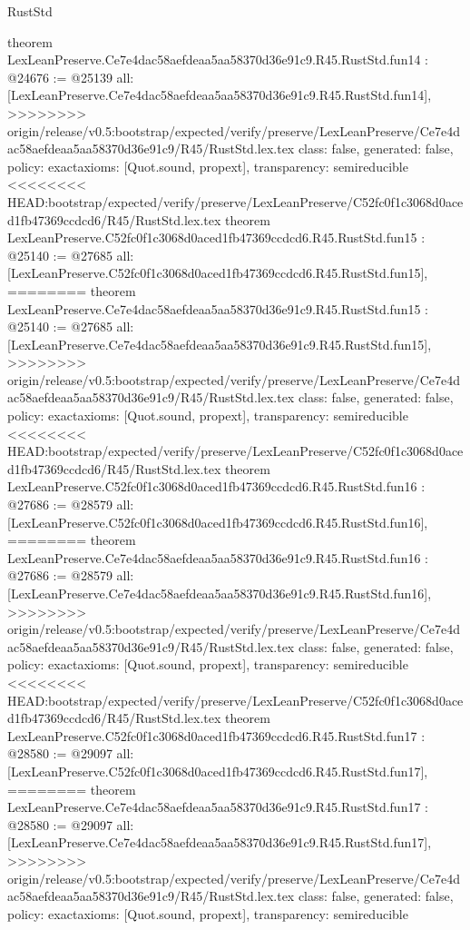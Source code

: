 \begin{lexlean}{RustStd}
\begin{coremodule}
{\begin{coremodule}
{{{{{{{{{{{{{{{{{theorem LexLeanPreserve.Ce7e4dac58aefdeaa5aa58370d36e91c9.R45.RustStd.fun14 : @24676 := @25139 {
  all: [LexLeanPreserve.Ce7e4dac58aefdeaa5aa58370d36e91c9.R45.RustStd.fun14],
>>>>>>>> origin/release/v0.5:bootstrap/expected/verify/preserve/LexLeanPreserve/Ce7e4dac58aefdeaa5aa58370d36e91c9/R45/RustStd.lex.tex
  class: false,
  generated: false,
  policy: exact{axioms: [Quot.sound, propext]},
  transparency: semireducible
}
<<<<<<<< HEAD:bootstrap/expected/verify/preserve/LexLeanPreserve/C52fc0f1c3068d0aced1fb47369ccdcd6/R45/RustStd.lex.tex
theorem LexLeanPreserve.C52fc0f1c3068d0aced1fb47369ccdcd6.R45.RustStd.fun15 : @25140 := @27685 {
  all: [LexLeanPreserve.C52fc0f1c3068d0aced1fb47369ccdcd6.R45.RustStd.fun15],
========
theorem LexLeanPreserve.Ce7e4dac58aefdeaa5aa58370d36e91c9.R45.RustStd.fun15 : @25140 := @27685 {
  all: [LexLeanPreserve.Ce7e4dac58aefdeaa5aa58370d36e91c9.R45.RustStd.fun15],
>>>>>>>> origin/release/v0.5:bootstrap/expected/verify/preserve/LexLeanPreserve/Ce7e4dac58aefdeaa5aa58370d36e91c9/R45/RustStd.lex.tex
  class: false,
  generated: false,
  policy: exact{axioms: [Quot.sound, propext]},
  transparency: semireducible
}
<<<<<<<< HEAD:bootstrap/expected/verify/preserve/LexLeanPreserve/C52fc0f1c3068d0aced1fb47369ccdcd6/R45/RustStd.lex.tex
theorem LexLeanPreserve.C52fc0f1c3068d0aced1fb47369ccdcd6.R45.RustStd.fun16 : @27686 := @28579 {
  all: [LexLeanPreserve.C52fc0f1c3068d0aced1fb47369ccdcd6.R45.RustStd.fun16],
========
theorem LexLeanPreserve.Ce7e4dac58aefdeaa5aa58370d36e91c9.R45.RustStd.fun16 : @27686 := @28579 {
  all: [LexLeanPreserve.Ce7e4dac58aefdeaa5aa58370d36e91c9.R45.RustStd.fun16],
>>>>>>>> origin/release/v0.5:bootstrap/expected/verify/preserve/LexLeanPreserve/Ce7e4dac58aefdeaa5aa58370d36e91c9/R45/RustStd.lex.tex
  class: false,
  generated: false,
  policy: exact{axioms: [Quot.sound, propext]},
  transparency: semireducible
}
<<<<<<<< HEAD:bootstrap/expected/verify/preserve/LexLeanPreserve/C52fc0f1c3068d0aced1fb47369ccdcd6/R45/RustStd.lex.tex
theorem LexLeanPreserve.C52fc0f1c3068d0aced1fb47369ccdcd6.R45.RustStd.fun17 : @28580 := @29097 {
  all: [LexLeanPreserve.C52fc0f1c3068d0aced1fb47369ccdcd6.R45.RustStd.fun17],
========
theorem LexLeanPreserve.Ce7e4dac58aefdeaa5aa58370d36e91c9.R45.RustStd.fun17 : @28580 := @29097 {
  all: [LexLeanPreserve.Ce7e4dac58aefdeaa5aa58370d36e91c9.R45.RustStd.fun17],
>>>>>>>> origin/release/v0.5:bootstrap/expected/verify/preserve/LexLeanPreserve/Ce7e4dac58aefdeaa5aa58370d36e91c9/R45/RustStd.lex.tex
  class: false,
  generated: false,
  policy: exact{axioms: [Quot.sound, propext]},
  transparency: semireducible
}}}}}}}}}}}}}}}}}}}}}
\end{coremodule}}
\end{coremodule}
\end{lexlean}
